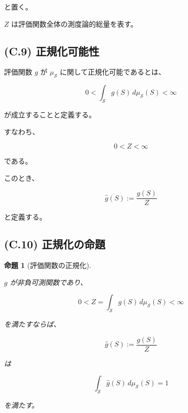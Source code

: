 \documentclass[a4paper,11pt]{article}
\newtheorem{proposition}[definition]{命題}
\newcommand{\Solver}{\mathcal{S}}
\begin{document}
と置く。

$Z$ は評価関数全体の測度論的総量を表す。


\subsection{(C.9) 正規化可能性}
\label{subsec:C9}

評価関数 $g$ が $\mu_{\Solver}$ に関して正規化可能であるとは、

\begin{equation}
    \boxed{
        0
        <
        \int_{\Solver}
        g(S)\,d\mu_{\Solver}(S)
        <
        \infty
    }
    \label{eq:C-normalizable}
\end{equation}

が成立することと定義する。

すなわち、

\begin{equation}
    0<Z<\infty
\end{equation}

である。

このとき、

\begin{equation}
    \boxed{
        \widehat g(S)
        :=
        \frac{g(S)}{Z}
    }
    \label{eq:C-normalized-evaluation}
\end{equation}

と定義する。


\subsection{(C.10) 正規化の命題}
\label{subsec:C10}

\begin{proposition}[評価関数の正規化]
\label{prop:C-normalization}

$g$ が非負可測関数であり、

\begin{equation}
    0
    <
    Z
    =
    \int_{\Solver}
    g(S)\,d\mu_{\Solver}(S)
    <
    \infty
\end{equation}

を満たすならば、

\begin{equation}
    \widehat g(S)
    :=
    \frac{g(S)}{Z}
\end{equation}

は

\begin{equation}
    \int_{\Solver}
    \widehat g(S)\,d\mu_{\Solver}(S)
    =
    1
\end{equation}

を満たす。
\end{proposition}
\end{document}
